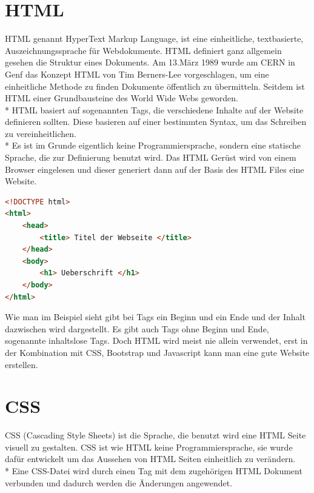 \section{HTML}
\author{Benjamin Besic}
HTML genannt HyperText Markup Language, ist eine einheitliche, textbasierte, Auszeichnungssprache für Webdokumente. HTML definiert ganz allgemein gesehen die Struktur eines Dokuments. 
Am 13.März 1989 wurde am CERN in Genf das Konzept HTML von Tim Berners-Lee vorgeschlagen, um eine einheitliche Methode zu finden Dokumente öffentlich zu übermitteln. Seitdem ist HTML  einer Grundbausteine des World Wide Webs geworden. \\*
HTML basiert auf sogenannten Tags, die verschiedene Inhalte auf der Website definieren sollten. Diese basieren auf einer bestimmten Syntax, um das Schreiben zu vereinheitlichen. \\*
Es ist im Grunde eigentlich keine Programmiersprache, sondern eine statische Sprache, die zur Definierung benutzt wird. 
Das HTML Gerüst wird von einem Browser eingelesen und dieser generiert dann auf der Basis des HTML Files eine Website. \cite{HTMLTut} \cite{HTMLSeoKueche}

\begin{lstlisting}[language=HTML,caption=HTML File Grundgerüst,label=lst:impl:foo]
<!DOCTYPE html>
<html>
    <head>
        <title> Titel der Webseite </title>
    </head>
    <body>
        <h1> Ueberschrift </h1>
    </body>
</html>
\end{lstlisting}

Wie man im Beispiel sieht gibt bei Tags ein Beginn und ein Ende und der Inhalt dazwischen wird dargestellt.
Es gibt auch Tags ohne Beginn und Ende, sogenannte inhaltslose Tags.
Doch HTML wird meist nie allein verwendet, erst in der Kombination mit CSS, Bootstrap und Javascript kann man eine gute Website erstellen.

\section{CSS}
\author{Benjamin Besic}
CSS (Cascading Style Sheets) ist die Sprache, die benutzt wird eine HTML Seite visuell zu gestalten. CSS ist wie HTML keine Programmiersprache, sie wurde dafür entwickelt um das Aussehen von HTML Seiten einheitlich zu verändern.\\*
Eine CSS-Datei wird durch einen Tag mit dem zugehörigen HTML Dokument verbunden und dadurch werden die Änderungen angewendet. \cite{CSSMozilla}

